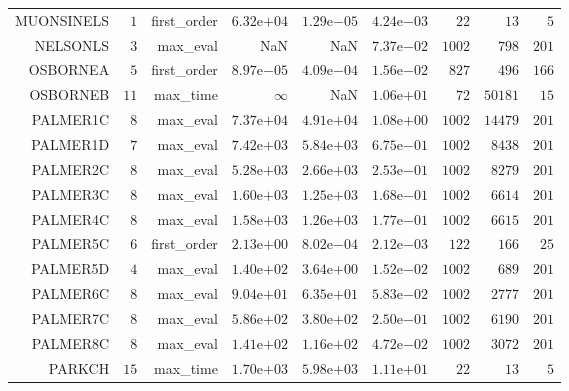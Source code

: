 \begin{longtable}{rrrrrrrrr}
MUONSINELS & \(     1\) & first\_order & \( 6.32\)e\(+04\) & \( 1.29\)e\(-05\) & \( 4.24\)e\(-03\) & \(    22\) & \(    13\) & \(     5\) \\
NELSONLS & \(     3\) & max\_eval &       NaN &       NaN & \( 7.37\)e\(-02\) & \(  1002\) & \(   798\) & \(   201\) \\
OSBORNEA & \(     5\) & first\_order & \( 8.97\)e\(-05\) & \( 4.09\)e\(-04\) & \( 1.56\)e\(-02\) & \(   827\) & \(   496\) & \(   166\) \\
OSBORNEB & \(    11\) & max\_time & \(\infty\) &       NaN & \( 1.06\)e\(+01\) & \(    72\) & \( 50181\) & \(    15\) \\
PALMER1C & \(     8\) & max\_eval & \( 7.37\)e\(+04\) & \( 4.91\)e\(+04\) & \( 1.08\)e\(+00\) & \(  1002\) & \( 14479\) & \(   201\) \\
PALMER1D & \(     7\) & max\_eval & \( 7.42\)e\(+03\) & \( 5.84\)e\(+03\) & \( 6.75\)e\(-01\) & \(  1002\) & \(  8438\) & \(   201\) \\
PALMER2C & \(     8\) & max\_eval & \( 5.28\)e\(+03\) & \( 2.66\)e\(+03\) & \( 2.53\)e\(-01\) & \(  1002\) & \(  8279\) & \(   201\) \\
PALMER3C & \(     8\) & max\_eval & \( 1.60\)e\(+03\) & \( 1.25\)e\(+03\) & \( 1.68\)e\(-01\) & \(  1002\) & \(  6614\) & \(   201\) \\
PALMER4C & \(     8\) & max\_eval & \( 1.58\)e\(+03\) & \( 1.26\)e\(+03\) & \( 1.77\)e\(-01\) & \(  1002\) & \(  6615\) & \(   201\) \\
PALMER5C & \(     6\) & first\_order & \( 2.13\)e\(+00\) & \( 8.02\)e\(-04\) & \( 2.12\)e\(-03\) & \(   122\) & \(   166\) & \(    25\) \\
PALMER5D & \(     4\) & max\_eval & \( 1.40\)e\(+02\) & \( 3.64\)e\(+00\) & \( 1.52\)e\(-02\) & \(  1002\) & \(   689\) & \(   201\) \\
PALMER6C & \(     8\) & max\_eval & \( 9.04\)e\(+01\) & \( 6.35\)e\(+01\) & \( 5.83\)e\(-02\) & \(  1002\) & \(  2777\) & \(   201\) \\
PALMER7C & \(     8\) & max\_eval & \( 5.86\)e\(+02\) & \( 3.80\)e\(+02\) & \( 2.50\)e\(-01\) & \(  1002\) & \(  6190\) & \(   201\) \\
PALMER8C & \(     8\) & max\_eval & \( 1.41\)e\(+02\) & \( 1.16\)e\(+02\) & \( 4.72\)e\(-02\) & \(  1002\) & \(  3072\) & \(   201\) \\
PARKCH & \(    15\) & max\_time & \( 1.70\)e\(+03\) & \( 5.98\)e\(+03\) & \( 1.11\)e\(+01\) & \(    22\) & \(    13\) & \(     5\) \\

\end{longtable}
